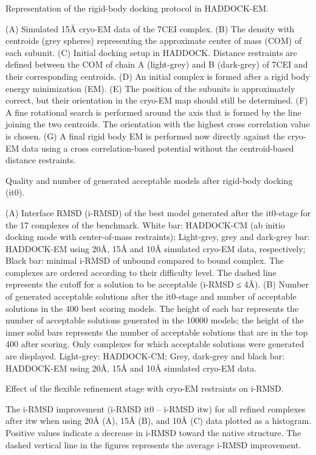 \caption{Representation of the rigid-body docking protocol in HADDOCK-EM.} 
{(A) Simulated 15Å cryo-EM data of the 7CEI complex. 
(B) The density with centroids (grey spheres) representing the approximate center of mass (COM) of each subunit. 
(C) Initial docking setup in HADDOCK. Distance restraints are defined between the COM of chain A (light-grey) and B (dark-grey) of 7CEI and their corresponding centroids. 
(D) An initial complex is formed after a rigid body energy minimization (EM). 
(E) The position of the subunits is approximately correct, but their orientation in the cryo-EM map should still be determined. 
(F) A fine rotational search is performed around the axis that is formed by the line joining the two centroids. 
The orientation with the highest cross correlation value is chosen. 
(G) A final rigid body EM is performed now directly against the cryo-EM data using a cross correlation-based potential without the centroid-based distance restraints.}
\stopbuffer


\caption{Quality and number of generated acceptable models after rigid-body docking (it0).}
{(A) Interface RMSD (i-RMSD) of the best model generated after the it0-stage for the 17 complexes of the benchmark. White bar: HADDOCK-CM (ab initio docking mode with center-of-mass restraints); Light-grey, grey and dark-grey bar: HADDOCK-EM using 20Å, 15Å and 10Å simulated cryo-EM data, respectively; Black bar: minimal i-RMSD of unbound compared to bound complex. The complexes are ordered according to their difficulty level. The dashed line represents the cutoff for a solution to be acceptable (i-RMSD ≤ 4Å).
(B) Number of generated acceptable solutions after the it0-stage and number of acceptable solutions in the 400 best scoring models. The height of each bar represents the number of acceptable solutions generated in the 10000 models; the height of the inner solid bars represents the number of acceptable solutions that are in the top 400 after scoring. Only complexes for which acceptable solutions were generated are displayed. Light-grey: HADDOCK-CM; Grey, dark-grey and black bar: HADDOCK-EM using 20Å, 15Å and 10Å simulated cryo-EM data.}
\stopbuffer
        

\caption{Effect of the flexible refinement stage with cryo-EM restraints on i-RMSD.}
{The i-RMSD improvement (i-RMSD it0 – i-RMSD itw) for all refined complexes after itw when using 20Å (A), 15Å (B), and 10Å (C) data plotted as a histogram. 
Positive values indicate a decrease in i-RMSD toward the native structure. The dashed vertical line in the figures represents the average i-RMSD improvement.}
\stopbuffer


